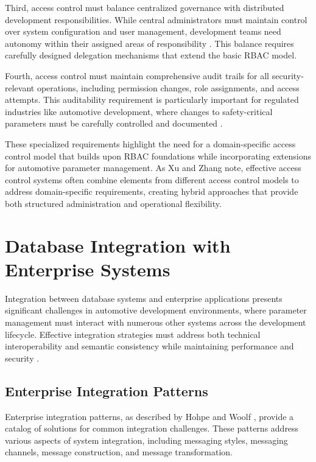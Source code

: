 Third, access control must balance centralized governance with distributed development responsibilities. While central administrators must maintain control over system configuration and user management, development teams need autonomy within their assigned areas of responsibility \cite{broy2006challenges}. This balance requires carefully designed delegation mechanisms that extend the basic RBAC model.

Fourth, access control must maintain comprehensive audit trails for all security-relevant operations, including permission changes, role assignments, and access attempts. This auditability requirement is particularly important for regulated industries like automotive development, where changes to safety-critical parameters must be carefully controlled and documented \cite{trovao2024evolution}.

These specialized requirements highlight the need for a domain-specific access control model that builds upon RBAC foundations while incorporating extensions for automotive parameter management. As Xu and Zhang \cite{xu2014specification} note, effective access control systems often combine elements from different access control models to address domain-specific requirements, creating hybrid approaches that provide both structured administration and operational flexibility.

\section{Database Integration with Enterprise Systems}
\label{sec:database-integration}

Integration between database systems and enterprise applications presents significant challenges in automotive development environments, where parameter management must interact with numerous other systems across the development lifecycle. Effective integration strategies must address both technical interoperability and semantic consistency while maintaining performance and security \cite{hohpe2002enterprise}.

\subsection{Enterprise Integration Patterns}
\label{subsec:enterprise-integration-patterns}

Enterprise integration patterns, as described by Hohpe and Woolf \cite{hohpe2002enterprise}, provide a catalog of solutions for common integration challenges. These patterns address various aspects of system integration, including messaging styles, messaging channels, message construction, and message transformation. 

